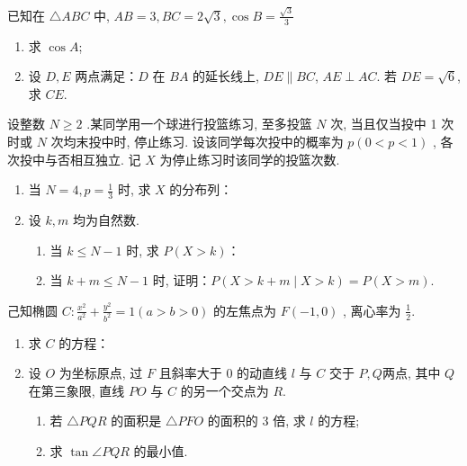 \documentclass{exam-zh}
\begin{document}
\begin{problem}[points=15]%
  已知在 $ \triangle A B C $ 中, $ A B=3, B C=2 \sqrt{3}, \cos
  B=\frac{\sqrt{3}}{3} $
  \begin{enumerate}
    \item 求 $\cos A$;
    \item 设 $D,E$ 两点满足：$D$ 在 $BA$ 的延长线上, $DE\parallel BC$,
      $AE\perp AC$.
      若 $DE=\sqrt{6}$, 求 $CE$.
  \end{enumerate}
\end{problem}

\begin{problem}[points=15]
  设整数  $N \geqslant 2 $ .某同学用一个球进行投篮练习, 至多投篮  $N$  次,
  当且仅当投中 1 次时或 $ N $ 次均末投中时, 停止练习.
  设该同学每次投中的概率为 $ p(0<p<1) $ , 各次投中与否相互独立.
  记 $ X $ 为停止练习时该同学的投篮次数.

  \begin{enumerate}
    \item 当 $N=4, p=\frac{1}{3}$ 时, 求  $X$ 的分布列：
    \item 设 $k, m$ 均为自然数.
      \begin{enumerate}
        \item 当 $ k \leqslant N-1$  时, 求 $P(X>k)$：
        \item 当 $ k+m \leqslant N-1 $ 时, 证明：$P(X>k+m \mid X>k)=P(X>m)$.
      \end{enumerate}
  \end{enumerate}
\end{problem}

\begin{problem}[points=17]
  己知椭圆 $ C: \frac{x^{2}}{a^{2}}+\frac{y^{2}}{b^{2}}=1(a>b>0) $ 的左焦点为 $F(-1,0)$ ,
  离心率为  $\frac{1}{2}$.

  \begin{enumerate}
    \item 求 $C$ 的方程：
    \item 设 $O$ 为坐标原点, 过 $F$ 且斜率大于 0 的动直线 $l$ 与 $C$ 交于 $P, Q$两点,
      其中 $ Q$ 在第三象限, 直线 $PO$  与 $C$  的另一个交点为 $R$.

      \begin{enumerate}
        \item 若 $\triangle PQR$  的面积是 $\triangle PFO$ 的面积的 3
          倍, 求  $l$  的方程;
        \item 求  $\tan \angle PQR$ 的最小值.
      \end{enumerate}

  \end{enumerate}
\end{problem}
\end{document}
